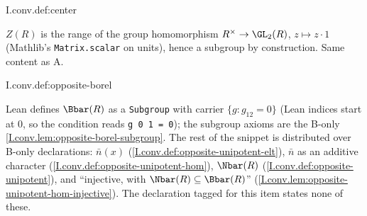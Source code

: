 \begin{definition}
\end{definition}
\begin{tfformal}{I.conv.def:center}
\begin{tffidelity}
$Z(R)$ is the range of the group homomorphism $R^\times\to\GL_2(R)$, $z\mapsto z\cdot1$ (Mathlib's \texttt{Matrix.scalar} on units), hence a subgroup by construction. Same content as A.
\end{tffidelity}
\end{tfformal}

\begin{definition}
\end{definition}
\begin{tfformal}{I.conv.def:opposite-borel}
\begin{tffidelity}
Lean defines $\Bbar(R)$ as a \texttt{Subgroup} with carrier $\{g:g_{12}=0\}$ (Lean indices start at $0$, so the condition reads \texttt{g 0 1 = 0}); the subgroup axioms are the B-only \cref{I.conv.lem:opposite-borel-subgroup}. The rest of the snippet is distributed over B-only declarations: $\bar n(x)$ (\cref{I.conv.def:opposite-unipotent-elt}), $\bar n$ as an additive character (\cref{I.conv.def:opposite-unipotent-hom}), $\Nbar(R)$ (\cref{I.conv.def:opposite-unipotent}), and ``injective, with $\Nbar(R)\subseteq\Bbar(R)$'' (\cref{I.conv.lem:opposite-unipotent-hom-injective}). The declaration tagged for this item states none of these.
\end{tffidelity}
\end{tfformal}

